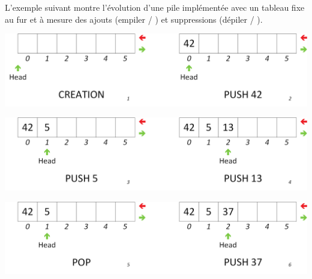 \documentclass[11pt,a4paper]{article}
\begin{document}
\smallskip

L'exemple suivant montre l'évolution d'une pile implémentée avec un tableau fixe au fur et à mesure des ajouts (empiler / ) et suppressions (dépiler / ).\\

\vfillFirst

\begin{center}
\includegraphics[scale=0.65]{img/piles/Piles_6_Tableau_Statique_Usage_pack_1.png}
\end{center}

\begin{center}
\includegraphics[scale=0.65]{img/piles/Piles_6_Tableau_Statique_Usage_pack_2.png}
\end{center}

\vfillLast

\clearpage

\begin{center}
\includegraphics[scale=0.65]{img/piles/Piles_6_Tableau_Statique_Usage_pack_3.png}
\end{center}

\smallskip
\end{document}
